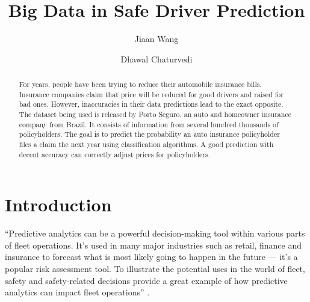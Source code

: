 \title{Big Data in Safe Driver Prediction}

\author{Jiaan Wang}

\author{Dhawal Chaturvedi}

\begin{abstract}

    For years, people have been trying to reduce their automobile
    insurance bills. Insurance companies claim that price will be
    reduced for good drivers and raised for bad ones. However,
    inaccuracies in their data predictions lead to the exact
    opposite. The dataset being used is released by Porto Seguro,
    an auto and homeowner insurance company from Brazil. It
    consists of information from several hundred thousands of
    policyholders. The goal is to predict the probability an auto
    insurance policyholder files a claim the next year using
    classification algorithms. A good prediction with decent
    accuracy can correctly adjust prices for policyholders.
    
\end{abstract}


\maketitle

\section{Introduction}

``Predictive analytics can be a powerful decision-making tool within various parts of fleet operations. It’s used in many major industries such as retail, finance and insurance to forecast what is most likely going to happen in the future — it’s a popular risk assessment tool. To illustrate the potential uses in the world of fleet, safety and safety-related decisions provide a great example of how predictive analytics can impact fleet operations'' \cite{Suizo2015decisions}.

